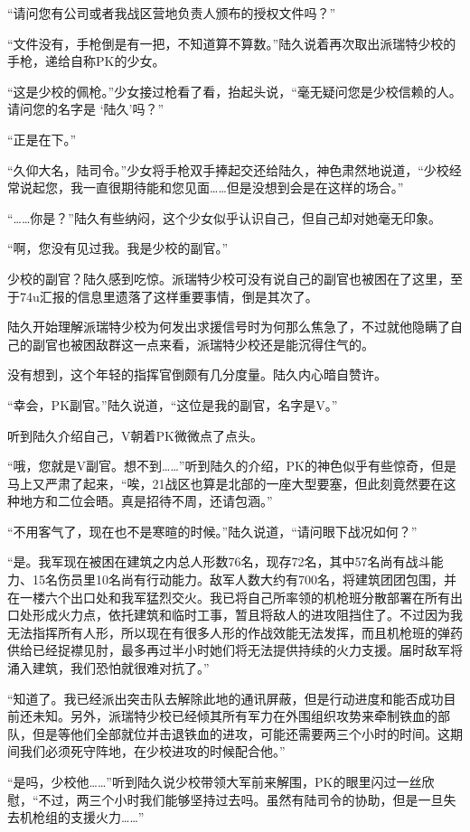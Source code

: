 “请问您有公司或者我战区营地负责人颁布的授权文件吗？”

“文件没有，手枪倒是有一把，不知道算不算数。”陆久说着再次取出派瑞特少校的手枪，递给自称PK的少女。

“这是少校的佩枪。”少女接过枪看了看，抬起头说，“毫无疑问您是少校信赖的人。请问您的名字是 ‘陆久’吗？”

“正是在下。”

“久仰大名，陆司令。”少女将手枪双手捧起交还给陆久，神色肃然地说道，“少校经常说起您，我一直很期待能和您见面……但是没想到会是在这样的场合。”

“……你是？”陆久有些纳闷，这个少女似乎认识自己，但自己却对她毫无印象。

“啊，您没有见过我。我是少校的副官。”

少校的副官？陆久感到吃惊。派瑞特少校可没有说自己的副官也被困在了这里，至于74u汇报的信息里遗落了这样重要事情，倒是其次了。

陆久开始理解派瑞特少校为何发出求援信号时为何那么焦急了，不过就他隐瞒了自己的副官也被困敌群这一点来看，派瑞特少校还是能沉得住气的。

没有想到，这个年轻的指挥官倒颇有几分度量。陆久内心暗自赞许。

“幸会，PK副官。”陆久说道，“这位是我的副官，名字是V。”

听到陆久介绍自己，V朝着PK微微点了点头。

“哦，您就是V副官。想不到……”听到陆久的介绍，PK的神色似乎有些惊奇，但是马上又严肃了起来，“唉，21战区也算是北部的一座大型要塞，但此刻竟然要在这种地方和二位会晤。真是招待不周，还请包涵。”

“不用客气了，现在也不是寒暄的时候。”陆久说道，“请问眼下战况如何？”

“是。我军现在被困在建筑之内总人形数76名，现存72名，其中57名尚有战斗能力、15名伤员里10名尚有行动能力。敌军人数大约有700名，将建筑团团包围，并在一楼六个出口处和我军猛烈交火。我已将自己所率领的机枪班分散部署在所有出口处形成火力点，依托建筑和临时工事，暂且将敌人的进攻阻挡住了。不过因为我无法指挥所有人形，所以现在有很多人形的作战效能无法发挥，而且机枪班的弹药供给已经捉襟见肘，最多再过半小时她们将无法提供持续的火力支援。届时敌军将涌入建筑，我们恐怕就很难对抗了。”

“知道了。我已经派出突击队去解除此地的通讯屏蔽，但是行动进度和能否成功目前还未知。另外，派瑞特少校已经倾其所有军力在外围组织攻势来牵制铁血的部队，但是等他们全部就位并击退铁血的进攻，可能还需要两三个小时的时间。这期间我们必须死守阵地，在少校进攻的时候配合他。”

“是吗，少校他……”听到陆久说少校带领大军前来解围，PK的眼里闪过一丝欣慰，“不过，两三个小时我们能够坚持过去吗。虽然有陆司令的协助，但是一旦失去机枪组的支援火力……”

